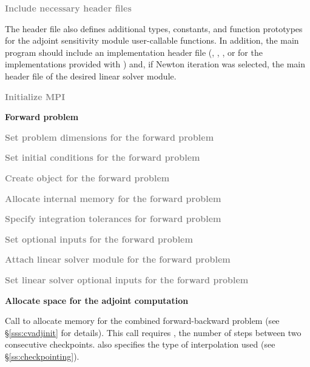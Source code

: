 \begin{Steps}

\item
  \textcolor{gray}{\bf Include necessary header files}
  
  The  header file also defines additional types, constants, and
  function prototypes for the adjoint sensitivity module user-callable functions.
  In addition, the main program should include an {\nvector} 
  implementation header file (,
  , , or 
  for the implementations provided with {\cvodes}) and, if Newton iteration 
  was selected, the main header file of the desired linear solver module.

\item
  \textcolor{gray}{\bf {\p} Initialize MPI}

  \vspace{0.2in}\centerline{\bf Forward problem}

\item
  \textcolor{gray}{\bf Set problem dimensions for the forward problem}

\item
  \textcolor{gray}{\bf Set initial conditions for the forward problem}

\item
  \textcolor{gray}{\bf Create {\cvodes} object for the forward problem}

\item
  \textcolor{gray}{\bf Allocate internal memory for the forward problem}

\item
  \textcolor{gray}{\bf Specify integration tolerances for forward problem}

\item
  \textcolor{gray}{\bf Set optional inputs for the forward problem}

\item
  \textcolor{gray}{\bf Attach linear solver module for the forward problem}

\item
  \textcolor{gray}{\bf Set linear solver optional inputs for the forward problem}

\item
  {\bf Allocate space for the adjoint computation}

  Call \id{()} to allocate memory for the 
  combined forward-backward problem (see \S\ref{sss:cvadjinit} for details).
  This call requires , the number of steps between two consecutive checkpoints.
   also specifies the type of interpolation used 
  (see \S\ref{ss:checkpointing}).


\end{Steps}
